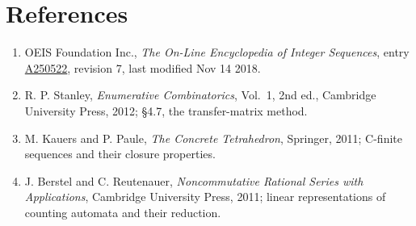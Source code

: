 \documentclass[11pt]{article}
\theoremstyle{definition}
\begin{document}
\section{References}

\begin{enumerate}

\item OEIS Foundation Inc., \emph{The On-Line Encyclopedia of Integer Sequences}, entry \href{https://oeis.org/A250522}{A250522}, revision 7, last modified Nov 14 2018.

\item R. P. Stanley, \emph{Enumerative Combinatorics}, Vol.~1, 2nd ed., Cambridge University Press, 2012; \S4.7, the transfer-matrix method.

\item M. Kauers and P. Paule, \emph{The Concrete Tetrahedron}, Springer, 2011; C-finite sequences and their closure properties.

\item J. Berstel and C. Reutenauer, \emph{Noncommutative Rational Series with Applications}, Cambridge University Press, 2011; linear representations of counting automata and their reduction.

\end{enumerate}
\end{document}
